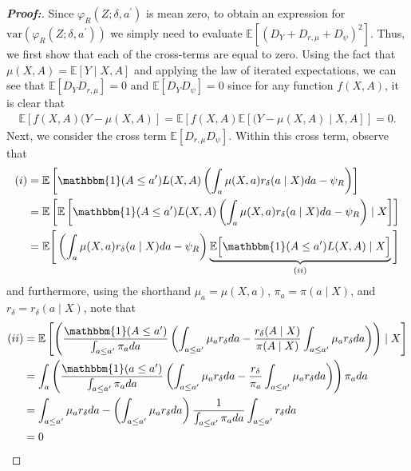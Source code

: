\documentclass[11pt,twoside]{article}
\newcommand{\var}{\text{var}}
\theoremstyle{definition}
\theoremstyle{remark}
\begin{document}
\begin{proof}[\textbf{Proof:}]
Since $\varphi_R(Z;\delta, a^\prime)$ is mean zero, to obtain an expression for $\var(\varphi_R(Z;\delta, a^\prime))$ we simply need to evaluate $\mathbb{E} [(D_Y + D_{r, \mu} + D_{\psi} )^2]$. Thus, we first show that each of the cross-terms are equal to zero. Using the fact that $\mu(X, A) = \mathbb{E}[Y \mid X, A]$ and applying the law of iterated expectations, we can see that $\mathbb{E}\left[ D_Y D_{r, \mu}\right] = 0$ and $\mathbb{E}\left[D_Y D_\psi \right] = 0$ since for any function $f(X, A)$, it is clear that
\begin{align*}
    \mathbb{E}\left[f(X, A)(Y - \mu(X, A) \right] = \mathbb{E}\left[f(X, A) \mathbb{E}\left[(Y - \mu(X, A) \mid X, A \right] \right] = 0.
\end{align*}
Next, we consider the cross term $\mathbb{E}[D_{r,\mu} D_\psi]$. Within this cross term, observe that
\begin{align*}
    (i) &= \mathbb{E}\left[ \mathbbm{1}(A \leq a^{\prime}) L(X, A)\left(\int_a \mu(X, a) r_\delta(a \mid X) da  - \psi_R \right) \right] \\
    &= \mathbb{E}\left[ \mathbb{E}\left[ \mathbbm{1}(A \leq a^{\prime}) L(X, A)\left(\int_a \mu(X, a) r_\delta(a \mid X) da  - \psi_R \right) \mid X \right] \right] \\
    &= \mathbb{E}\Bigg[ \left(\int_a \mu(X, a) r_\delta(a \mid X) da  - \psi_R \right) \underbrace{\mathbb{E}\Big[ \mathbbm{1}(A \leq a^{\prime}) L(X, A) \mid X \Big]}_{(ii)} \Bigg] 
\end{align*}
and furthermore, using the shorthand $\mu_a = \mu(X, a)$, $\pi_a = \pi(a \mid X)$, and $r_\delta = r_\delta(a \mid X)$, note that
\begin{align*}
   (ii) &= \mathbb{E}\left[\left( \frac{\mathbbm{1}(A \leq a^{\prime})}{\int_{a \leq a^{\prime}} \pi_a da} \left(\int_{a \leq a^{\prime}}\mu_a r_\delta da - \frac{r_\delta(A \mid X) }{\pi(A \mid X)} \int_{a \leq a^{\prime}} \mu_a r_\delta da\right) \right)\mid X \right] \\
   &= \int_a \left( \frac{\mathbbm{1}(a \leq a^{\prime})}{\int_{a \leq a^{\prime}} \pi_a da} \left(\int_{a \leq a^{\prime}}\mu_a r_\delta da - \frac{r_\delta }{\pi_a} \int_{a \leq a^{\prime}} \mu_a r_\delta da\right) \right) \pi_a da \\
   &= \int_{a \leq a^{\prime}}\mu_a r_\delta da - \left( \int_{a \leq a^{\prime}} \mu_a r_\delta da\right) \frac{1}{\int_{a \leq a^{\prime}} \pi_a da}\int_{a \leq a^{\prime}}  r_\delta da \\
   &= 0
\end{align*}

\end{proof}
\end{document}
